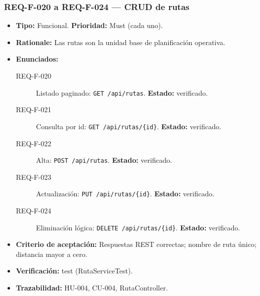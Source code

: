 \documentclass[12pt,a4paper]{article}
\begin{document}
\subsubsection{REQ-F-020 a REQ-F-024 --- CRUD de rutas}
\begin{itemize}
  \item \textbf{Tipo:} Funcional. \textbf{Prioridad:} Must (cada uno).
  \item \textbf{Rationale:} Las rutas son la unidad base de planificación operativa.
  \item \textbf{Enunciados:}
    \begin{description}
      \item[REQ-F-020] Listado paginado: \texttt{GET /api/rutas}. \textbf{Estado:} verificado.
      \item[REQ-F-021] Consulta por id: \texttt{GET /api/rutas/\{id\}}. \textbf{Estado:} verificado.
      \item[REQ-F-022] Alta: \texttt{POST /api/rutas}. \textbf{Estado:} verificado.
      \item[REQ-F-023] Actualización: \texttt{PUT /api/rutas/\{id\}}. \textbf{Estado:} verificado.
      \item[REQ-F-024] Eliminación lógica: \texttt{DELETE /api/rutas/\{id\}}. \textbf{Estado:} verificado.
    \end{description}
  \item \textbf{Criterio de aceptación:} Respuestas REST correctas; nombre de ruta único; distancia mayor a cero.
  \item \textbf{Verificación:} test (RutaServiceTest).
  \item \textbf{Trazabilidad:} HU-004, CU-004, RutaController.
\end{itemize}

\end{document}
